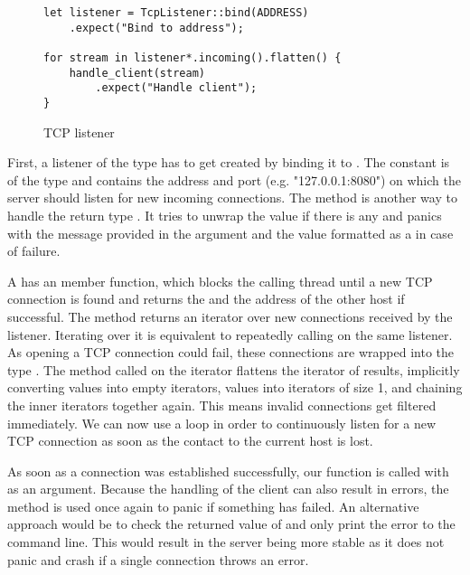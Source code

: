 \begin{figure}[ht]
    \begin{verbatim}
let listener = TcpListener::bind(ADDRESS)
    .expect("Bind to address");

for stream in listener*.incoming().flatten() {
    handle_client(stream)
        .expect("Handle client");
}
    \end{verbatim}
    \caption{TCP listener}
    \label{tcp-listener}
\end{figure}

First, a listener of the type  has to get created by binding it to . The
constant  is of the type  and contains the address and port (e.g. "127.0.0.1:8080") on which
the server should listen for new incoming connections. The method  is another way to handle the return
type . It tries to unwrap the  value if there is any and panics with the message provided in the
argument and the  value formatted as a  in case of failure.

A  has an  member function, which blocks the calling thread until a new TCP connection
is found and returns the  and the address of the other host if successful. The method 
returns an iterator over new connections received by the listener. Iterating over it is equivalent to repeatedly
calling  on the same listener. As opening a TCP connection could fail, these connections are wrapped into
the type . The method  called on the iterator flattens the iterator of results, implicitly
converting  values into empty iterators,  values into iterators of size 1, and chaining the inner
iterators together again. This means invalid connections get filtered immediately. We can now use a  loop in
order to continuously listen for a new TCP connection as soon as the contact to the current host is lost.

As soon as a connection was established successfully, our function  is called with  as
an argument. Because the handling of the client can also result in errors, the  method is used once again
to panic if something has failed. An alternative approach would be to check the returned value of 
and only print the error to the command line. This would result in the server being more stable as it does not panic
and crash if a single connection throws an error.

